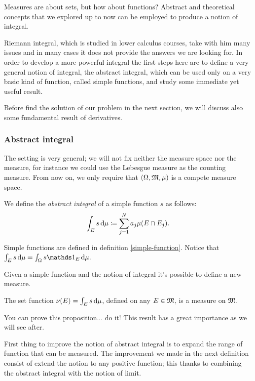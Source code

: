 Measures are about sets, but how about functions? Abstract and theoretical concepts that we explored up to now can be employed to produce a notion of integral.

Riemann integral, which is studied in lower calculus courses, take with him many issues and in many cases it does not provide the answers we are looking for. In order to develop a more powerful integral the first steps here are to define a very general notion of integral, the abstract integral, which can be used only on a very basic kind of function, called simple functions, and study some immediate yet useful result.

Before find the solution of our problem in the next section, we will discuss also some fundamental result of derivatives.

\subsubsection{Abstract integral}

The setting is very general; we will not fix neither the measure space nor the measure, for instance we could use the Lebesgue measure as the counting measure. From now on, we only require that $(\Omega, \mathfrak M, \mu)$ is a compete measure space.

\begin{defn} \label{defn-int-simple-f}
	We define the \emph{abstract integral} of a simple function
	$s$ as follows:
	$$
		\int_E s \,\mathrm d\mu 
		\coloneqq \sum_{j=1}^N a_j \mu(E \cap E_j)
	.
	$$
\end{defn}

Simple functions are defined in definition \vref{simple-function}. Notice that $\int_E s \, \de\mu = \int_\Omega s \Ind_E\, \de\mu$.

Given a simple function and the notion of integral it's possible to define a new measure.
\begin{prop}
	The set function $\nu(E) = \int_E s \, \mathrm d\mu$, defined on any $E \in \mathfrak M$, is a measure on $\mathfrak M$. 
\end{prop}
You can prove this proposition... do it! This result has a great importance as we will see after.

First thing to improve the notion of abstract integral is to expand the range of function that can be measured. The improvement we made in the next definition consist of extend the notion to any positive function; this thanks to combining the abstract integral with the notion of limit.

